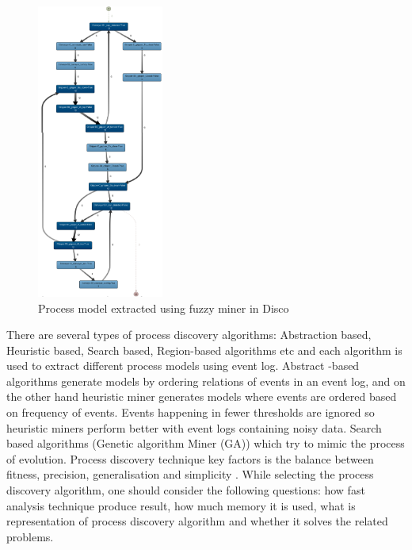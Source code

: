 \documentclass[conference]{IEEEtran}
\begin{document}
\begin{figure}[!t]
	\centering
	\includegraphics[width=0.37\textwidth]{images/disco.png}
	\caption{Process model extracted using fuzzy miner in Disco}
	\label{fig:fm}
\end{figure}


 There are several types of process discovery algorithms: Abstraction based, Heuristic based, Search based, Region-based algorithms etc and each algorithm is used to extract different process models using event log. Abstract -based algorithms generate models by ordering relations of events in an event log, and on the other hand heuristic miner generates models where events are ordered based on frequency of events. Events happening in fewer thresholds are ignored so heuristic miners perform better with event logs containing noisy data. Search based algorithms (Genetic algorithm Miner (GA)) which try to mimic the process of evolution. Process discovery technique key factors is the balance between fitness, precision, generalisation and simplicity \cite{buijs2012role}. While selecting the process discovery algorithm, one should consider the following questions: how fast analysis technique produce result, how much memory it is used, what is representation of process discovery algorithm and whether it solves the related problems.
 
\end{document}
